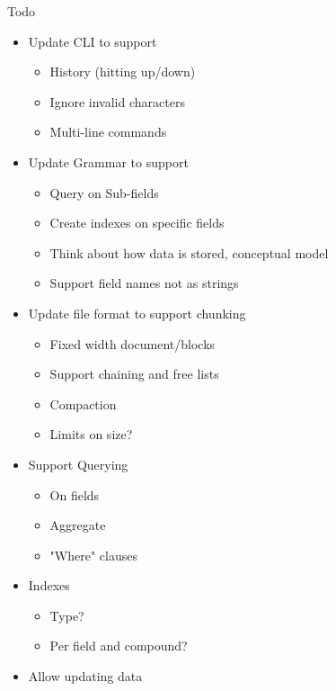 \documentclass{article}
\begin{document}
Todo

\begin{itemize}

    \item   Update CLI to support
        \begin{itemize}
            \item    History (hitting up/down)
            \item    Ignore invalid characters
            \item    Multi-line commands
        \end{itemize}
    \item   Update Grammar to support
        \begin{itemize}
            \item    Query on Sub-fields
            \item    Create indexes on specific fields
            \item    Think about how data is stored, conceptual model
            \item    Support field names not as strings
        \end{itemize}
    \item   Update file format to support chunking
        \begin{itemize}
            \item   Fixed width document/blocks
            \item   Support chaining and free lists
            \item   Compaction
            \item   Limits on size?
        \end{itemize}
    \item   Support Querying
        \begin{itemize}
            \item    On fields
            \item    Aggregate
            \item    "Where" clauses
        \end{itemize}
    \item   Indexes
        \begin{itemize}
            \item    Type?
            \item    Per field and compound?
        \end{itemize}
    \item   Allow updating data
        \begin{itemize}

\end{itemize}
\end{itemize}
\end{document}
